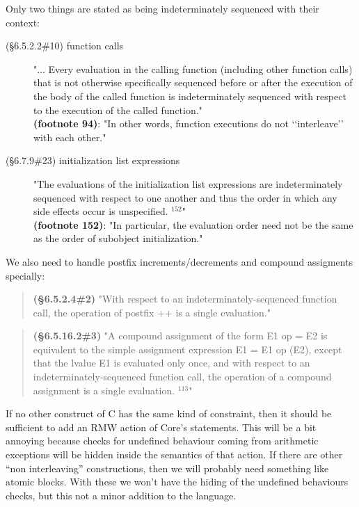 \documentclass[12pt, a4paper]{article}
\newcommand{\csyn}[1]{{\fontspec{Courier} #1}} %
\begin{document}
Only two things are stated as being indeterminately sequenced with their context:
\begin{description}
\item[(§6.5.2.2\#10) function calls]
  "... Every evaluation in the calling function (including other function
  calls) that is not otherwise specifically sequenced before or after the
  execution of the body of the called function is indeterminately sequenced
  with respect to the execution of the called function."\\
  {\bf (footnote 94)}:
  "In other words, function executions do not ‘‘interleave’’ with each
  other."
  
\item[(§6.7.9\#23) initialization list expressions]
  "The evaluations of the initialization list expressions are
  indeterminately sequenced with respect to one another and thus the order
  in which any side effects occur is unspecified. ${}^{152}$"\\
  {\bf (footnote 152)}:
  "In particular, the evaluation order need not be the same as the order of
  subobject initialization."
\end{description}

We also need to handle postfix increments/decrements and compound assigments specially:
\begin{quote}
  {\bf (§6.5.2.4\#2)}
  "With respect to an indeterminately-sequenced function call, the operation
  of postfix ++ is a single evaluation."
\end{quote}

\begin{quote}
  {\bf (§6.5.16.2\#3)}
  "A compound assignment of the form \csyn{E1 op = E2} is equivalent to the simple
  assignment expression \csyn{E1 = E1 op (E2)}, except that the lvalue \csyn{E1} is
  evaluated only once, and with respect to an indeterminately-sequenced
  function call, the operation of a compound assignment is a single
  evaluation. ${}^{113}$"
\end{quote}


If no other construct of C has the same kind of constraint, then it should be sufficient to add an RMW action of Core's statements.
This will be a bit annoying because checks for undefined behaviour coming from arithmetic exceptions will be hidden inside the semantics
of that action.
If there are other ``non interleaving'' constructions, then we will probably need something like atomic blocks.
With these we won't have the hiding of the undefined behaviours checks, but this not a minor addition to the language.
\end{document}
